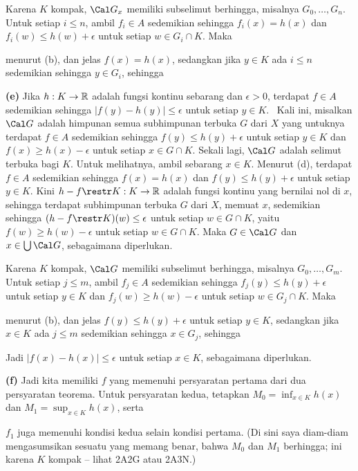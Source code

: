 {Karena $K$ kompak, $\Cal G_x$ memiliki subselimut berhingga, misalnya
$G_0,\ldots,G_n$. Untuk setiap $i\le n$, ambil $f_i\in A$ sedemikian
sehingga $f_i(x)=h(x)$ dan $f_i(w)\le h(w)+\epsilon$ untuk setiap
$w\in G_i\cap K$. Maka
      
      
\noindent menurut (b), dan jelas $f(x)=h(x)$, sedangkan jika $y\in K$ ada
$i\le n$ sedemikian sehingga $y\in G_i$, sehingga
      
      
      
\medskip
      
{\bf (e)} Jika $h:K\to\Bbb R$ adalah fungsi kontinu sebarang dan $\epsilon>0$,
terdapat $f\in A$ sedemikian sehingga $|f(y)-h(y)|\le\epsilon$ untuk setiap
$y\in K$. \Prf\ Kali ini, misalkan $\Cal G$ adalah himpunan semua
subhimpunan terbuka $G$ dari $X$ yang untuknya terdapat $f\in A$ sedemikian
sehingga $f(y)\le h(y)+\epsilon$ untuk setiap $y\in K$ dan
$f(x)\ge h(x)-\epsilon$ untuk setiap $x\in G\cap K$. Sekali lagi, $\Cal G$
adalah selimut terbuka bagi $K$. Untuk melihatnya, ambil sebarang $x\in K$.
Menurut (d), terdapat $f\in A$ sedemikian sehingga $f(x)=h(x)$ dan
$f(y)\le h(y)+\epsilon$ untuk setiap $y\in K$. Kini
$h-f\restr K:K\to\Bbb R$ adalah fungsi kontinu yang bernilai nol di $x$,
sehingga terdapat subhimpunan terbuka $G$ dari $X$, memuat $x$, sedemikian
sehingga $(h-f\restr K)(w)\le\epsilon$ untuk setiap $w\in G\cap K$, yaitu
$f(w)\ge h(w)-\epsilon$ untuk setiap $w\in G\cap K$. Maka $G\in\Cal G$
dan $x\in\bigcup\Cal G$, sebagaimana diperlukan.
      
Karena $K$ kompak, $\Cal G$ memiliki subselimut berhingga, misalnya
$G_0,\ldots,G_m$. Untuk setiap $j\le m$, ambil $f_j\in A$ sedemikian
sehingga $f_j(y)\le h(y)+\epsilon$ untuk setiap $y\in K$ dan
$f_j(w)\ge h(w)-\epsilon$ untuk setiap $w\in G_j\cap K$. Maka
      
      
\noindent menurut (b), dan jelas $f(y)\le h(y)+\epsilon$ untuk setiap
$y\in K$, sedangkan jika $x\in K$ ada $j\le m$ sedemikian sehingga
$x\in G_j$, sehingga
      
      
\noindent Jadi $|f(x)-h(x)|\le\epsilon$ untuk setiap $x\in K$, sebagaimana
diperlukan. \Qed
      
\medskip
      
{\bf (f)} Jadi kita memiliki $f$ yang memenuhi persyaratan pertama dari dua
persyaratan teorema. Untuk persyaratan kedua, tetapkan
$M_0=\inf_{x\in K}h(x)$ dan $M_1=\sup_{x\in K}h(x)$, serta
      
      
\noindent $f_1$ juga memenuhi kondisi kedua selain kondisi pertama.
(Di sini saya diam-diam mengasumsikan sesuatu yang memang benar, bahwa $M_0$
dan $M_1$ berhingga; ini karena $K$ kompak -- lihat 2A2G atau 2A3N.)
}%
